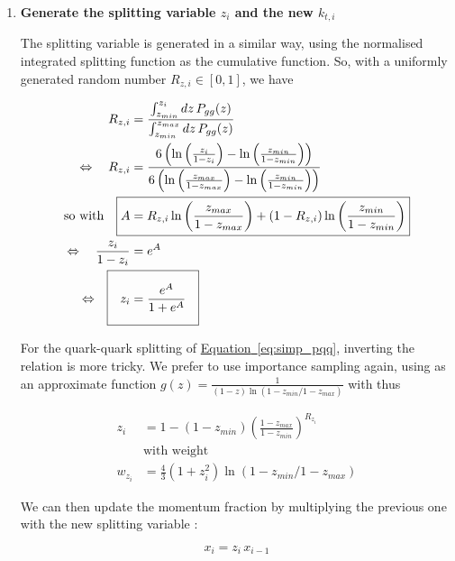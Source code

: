 \documentclass[a4paper,10pt]{report}
\newcommand{\eqlabel}{{Equation}}
\newcommand{\equref}[1]{\hyperref[#1]{\eqlabel~\ref*{#1}}}
\begin{document}
\begin{enumerate}
        \item \textbf{Generate the splitting variable $z_i$ and the new $k_{t,i}$}
        
              The splitting variable is generated in a similar way, using the normalised integrated
              splitting function as the cumulative function. So, with a uniformly generated random 
              number $R_{z,i} \in [0,1]$, we have 

              \begin{align}
                R_{z,i} &= \frac{\int_{z_{min}}^{z_i}dz\,P_{gg}(z)}{\int_{z_{min}}^{z_{max}}dz\,P_{gg}(z)} \nonumber \\
                \Leftrightarrow \quad
                R_{z,i} &= \frac{6\left(\ln\left(\frac{z_i}{1-z_i}\right)-\ln\left(\frac{z_{min}}{1-z_{min}}\right)\right)}{6\left(\ln\left(\frac{z_{max}}{1-z_{max}}\right)-\ln\left(\frac{z_{min}}{1-z_{min}}\right)\right)} \nonumber \\
                \text{so with}\quad \Aboxed{A &= R_{z,i}\ln\left(\frac{z_{max}}{1-z_{max}}\right) + (1-R_{z,i})\ln\left(\frac{z_{min}}{1-z_{min}}\right)} \nonumber \\ 
                \Leftrightarrow \quad 
                \frac{z_i}{1-z_i} &= e^A \nonumber \\ 
                \Leftrightarrow \quad 
                \setlength\fboxsep{1em}
                \Aboxed{z_i &= \frac{e^A}{1 + e^A}}
              \end{align}

              For the quark-quark splitting of \equref{eq:simp_pqq}, inverting the relation is more tricky. 
              We prefer to use importance sampling again, using as an approximate function 
              $g(z) = \frac{1}{(1-z)\ln\left(1-z_{min}/1-z_{max}\right)}$ with thus 

              \begin{align}
                z_i &= 1 - (1-z_{min})\left(\frac{1-z_{max}}{1-z_{min}}\right)^{R_{z_i}} \\
                &\text{with weight} \nonumber\\ 
                w_{z_i} &= \frac{4}{3}(1+z_i^2)\ln\left(1-z_{min}/1-z_{max}\right)
              \end{align}

              We can then update the momentum fraction by multiplying the previous one with the new splitting variable : 

              \begin{equation}
                x_i = z_i\, x_{i-1}
              \end{equation}


\end{enumerate}
\end{document}
